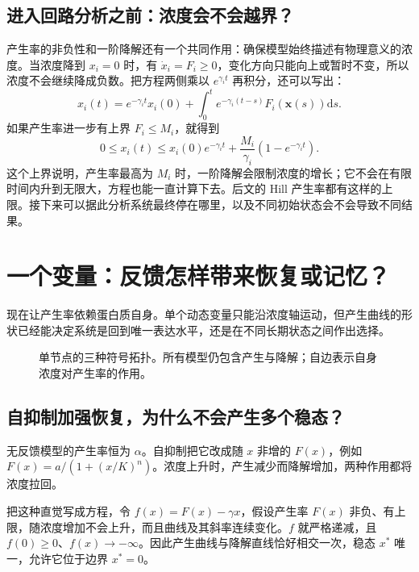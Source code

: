 \documentclass[11pt,a4paper,UTF8,fontset=fandol]{ctexart}
\newcommand{\dd}{\mathrm d}\newcommand{\R}{\mathbb R}\newcommand{\ssv}{\mathrm{ss}}
\begin{document}
\subsection{进入回路分析之前：浓度会不会越界？}
产生率的非负性和一阶降解还有一个共同作用：确保模型始终描述有物理意义的浓度。当浓度降到 $x_i=0$ 时，有 $\dot x_i=F_i\geq0$，变化方向只能向上或暂时不变，所以浓度不会继续降成负数。把方程两侧乘以 $e^{\gamma_i t}$ 再积分，还可以写出：
\[
x_i(t)=e^{-\gamma_it}x_i(0)+\int_0^t e^{-\gamma_i(t-s)}F_i(\bm x(s))\dd s.
\]
如果产生率进一步有上界 $F_i\leq M_i$，就得到
\begin{equation}
0\leq x_i(t)\leq x_i(0)e^{-\gamma_it}+\frac{M_i}{\gamma_i}(1-e^{-\gamma_it}).\label{eq:bound}
\end{equation}
这个上界说明，产生率最高为 $M_i$ 时，一阶降解会限制浓度的增长；它不会在有限时间内升到无限大，方程也能一直计算下去。后文的 Hill 产生率都有这样的上限。接下来可以据此分析系统最终停在哪里，以及不同初始状态会不会导致不同结果。

\section{一个变量：反馈怎样带来恢复或记忆？}
现在让产生率依赖蛋白质自身。单个动态变量只能沿浓度轴运动，但产生曲线的形状已经能决定系统是回到唯一表达水平，还是在不同长期状态之间作出选择。

\begin{figure}[H]\centering
{}
\caption{单节点的三种符号拓扑。所有模型仍包含产生与降解；自边表示自身浓度对产生率的作用。}
\end{figure}
\subsection{自抑制加强恢复，为什么不会产生多个稳态？}
无反馈模型的产生率恒为 $\alpha$。自抑制把它改成随 $x$ 非增的 $F(x)$，例如 $F(x)=a/(1+(x/K)^n)$。浓度上升时，产生减少而降解增加，两种作用都将浓度拉回。

把这种直觉写成方程，令 $f(x)=F(x)-\gamma x$，假设产生率 $F(x)$ 非负、有上限，随浓度增加不会上升，而且曲线及其斜率连续变化。$f$ 就严格递减，且 $f(0)\geq0$、$f(x)\to-\infty$。因此产生曲线与降解直线恰好相交一次，稳态 $x^*$ 唯一，允许它位于边界 $x^*=0$。
\end{document}
